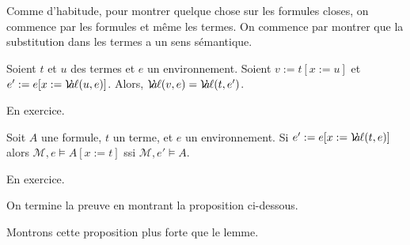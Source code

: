 \documentclass[./main]{subfiles}
\begin{document}
  \begin{prv}
    Comme d'habitude, pour montrer quelque chose sur les formules closes, on commence par les formules et même les termes.
    On commence par montrer que la substitution dans les termes a un sens sémantique.

    \begin{lem}
      Soient $t$ et $u$ des termes et $e$ un environnement.
      Soient $v := t[x:=u]$ et $e' := e[x := \mathcal{V}\hspace{-3.5pt}a\hspace{-0.5pt}\ell(u, e)]$.
      Alors,  $\mathcal{V}\hspace{-3.5pt}a\hspace{-0.5pt}\ell(v, e) = \mathcal{V}\hspace{-3.5pt}a\hspace{-0.5pt}\ell(t, e')$.
    \end{lem}
    \begin{prv}
      En exercice.
    \end{prv}

    \begin{lem}
      Soit $A$ une formule, $t$ un terme, et $e$ un environnement.
      Si $e' := e[x := \mathcal{V}\hspace{-3.5pt}a\hspace{-0.5pt}\ell(t, e)]$ alors  $\mathcal{M}, e \models A[x := t]$ ssi $\mathcal{M}, e' \models A$.
    \end{lem}
    \begin{prv}
      En exercice.
    \end{prv}

    On termine la preuve en montrant la proposition ci-dessous.
  \end{prv}

  Montrons cette proposition plus forte que le lemme.
\end{document}
